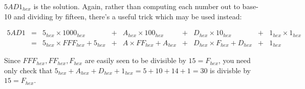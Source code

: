 


\(5AD1_{hex}\) is the solution. Again, rather than computing each number out
to base-10 and dividing by fifteen, there's a useful trick which may be
used instead:

\[
  \begin{array}{rcccccccc}
  5AD1 & = & 5_{hex}\times1000_{hex} &+& A_{hex}\times100_{hex} &+& D_{hex}\times10_{hex} &+& 1_{hex}\times1_{hex} \\
       & = & 5_{hex}\times FFF_{hex}+5_{hex} &+& A\times FF_{hex}+A_{hex} &+& D_{hex}\times F_{hex}+D_{hex} &+& 1_{hex}
  \end{array}
\]

Since \(FFF_{hex},FF_{hex},F_{hex}\) are easily seen to be divisible by
\(15=F_{hex}\), you need only check that
\(5_{hex}+A_{hex}+D_{hex}+1_{hex}=5+10+14+1=30\)
is divisble by \(15=F_{hex}\).
